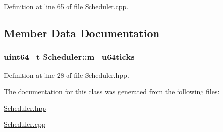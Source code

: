 Definition at line 65 of file Scheduler.\+cpp.



\subsection{Member Data Documentation}
\subsubsection[{\texorpdfstring{m\+\_\+u64ticks}{m_u64ticks}}]{\setlength{\rightskip}{0pt plus 5cm}uint64\+\_\+t Scheduler\+::m\+\_\+u64ticks}\hypertarget{class_scheduler_a9aaefbc345158ce681dbcd9df58afd80}{}\label{class_scheduler_a9aaefbc345158ce681dbcd9df58afd80}


Definition at line 28 of file Scheduler.\+hpp.



The documentation for this class was generated from the following files\+:\begin{DoxyCompactItemize}
\item 
\hyperlink{_scheduler_8hpp}{Scheduler.\+hpp}\item 
\hyperlink{_scheduler_8cpp}{Scheduler.\+cpp}\end{DoxyCompactItemize}
